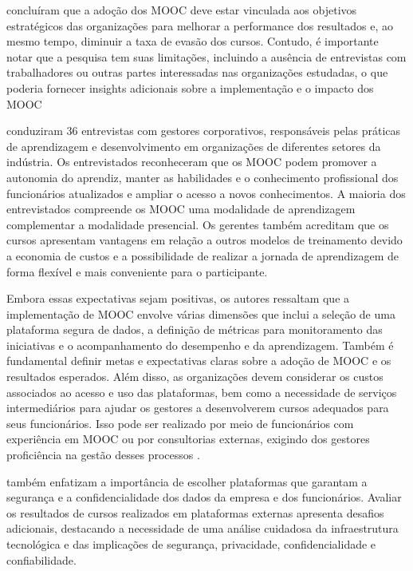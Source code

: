 \documentclass[portuguese]{textolivre}
\begin{document}
\textcite{park_moocs_2021} concluíram que a adoção dos MOOC deve estar vinculada aos objetivos estratégicos das organizações para melhorar a performance dos resultados e, ao mesmo tempo, diminuir a taxa de evasão dos cursos. Contudo, é importante notar que a pesquisa tem suas limitações, incluindo a ausência de entrevistas com trabalhadores ou outras partes interessadas nas organizações estudadas, o que poderia fornecer insights adicionais sobre a implementação e o impacto dos MOOC

\textcite{zur_transforming_2021} conduziram 36 entrevistas com gestores corporativos, responsáveis pelas práticas de aprendizagem e desenvolvimento em organizações de diferentes setores da indústria.  Os entrevistados reconheceram que os MOOC podem promover a autonomia do aprendiz, manter as habilidades e o conhecimento profissional dos funcionários atualizados e ampliar o acesso a novos conhecimentos. A maioria dos entrevistados compreende os MOOC uma modalidade de aprendizagem complementar a modalidade presencial. Os gerentes também acreditam que os cursos apresentam vantagens em relação a outros modelos de treinamento devido a economia de custos e a possibilidade de realizar a jornada de aprendizagem de forma flexível e mais conveniente para o participante.

Embora essas expectativas sejam positivas, os autores ressaltam que a implementação de MOOC envolve várias dimensões que inclui a seleção de uma plataforma segura de dados, a definição de métricas para monitoramento das iniciativas e o acompanhamento do desempenho e da aprendizagem. Também é fundamental definir metas e expectativas claras sobre a adoção de MOOC e os resultados esperados. Além disso, as organizações devem considerar os custos associados ao acesso e uso das plataformas, bem como a necessidade de serviços intermediários para ajudar os gestores a desenvolverem cursos adequados para seus funcionários. Isso pode ser realizado por meio de funcionários com experiência em MOOC ou por consultorias externas, exigindo dos gestores proficiência na gestão desses processos \cite{zur_transforming_2021}.

\textcite{zur_transforming_2021} também enfatizam a importância de escolher plataformas que garantam a segurança e a confidencialidade dos dados da empresa e dos funcionários. Avaliar os resultados de cursos realizados em plataformas externas apresenta desafios adicionais, destacando a necessidade de uma análise cuidadosa da infraestrutura tecnológica e das implicações de segurança, privacidade, confidencialidade e confiabilidade. 
\end{document}

